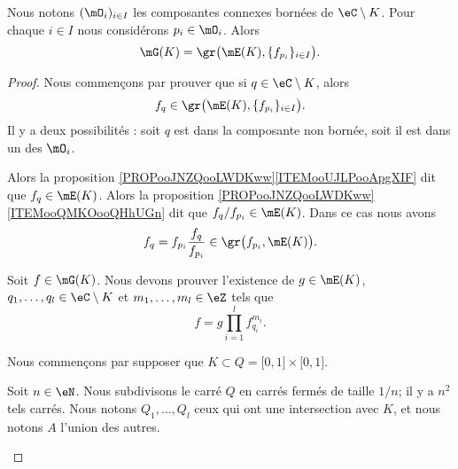 \begin{lemma}     \label{LEMooEJRMooNJhMov}
	Nous notons \( (\mO_i)_{i\in I}\) les composantes connexes bornées de \( \eC\setminus K\). Pour chaque \( i\in I\) nous considérons \( p_i\in\mO_i\). Alors
	\begin{equation}
		\mG(K)=\gr\big( \mE(K),\{ f_{p_i} \}_{i\in I} \big).
	\end{equation}
\end{lemma}

\begin{proof}
	Nous commençons par prouver que si \( q\in\eC\setminus K\), alors
	\begin{equation}
		f_q\in\gr\big( \mE(K),\{ f_{p_i} \}_{i\in I} \big).
	\end{equation}
	Il y a deux possibilités : soit \( q\) est dans la composante non bornée, soit il est dans un des \( \mO_i\).
	\begin{subproof}
		Alors la proposition \ref{PROPooJNZQooLWDKww}\ref{ITEMooUJLPooApgXIF} dit que \( f_q\in\mE(K)\).
		\spitem[Si \( q\in\mO_i\)]
		Alors la proposition \ref{PROPooJNZQooLWDKww}\ref{ITEMooQMKOooQHhUGn} dit que \( f_q/f_{p_i}\in\mE(K)\). Dans ce cas nous avons
		\begin{equation}
			f_q=f_{p_i}\frac{ f_q }{ f_{p_i} }\in\gr\big( f_{p_i},\mE(K) \big).
		\end{equation}
	\end{subproof}
	Soit \( f\in\mG(K)\). Nous devons prouver l'existence de \( g\in\mE(K)\), \( q_1,\ldots, q_l\in\eC\setminus K\) et \( m_1,\ldots, m_l\in \eZ\) tels que
	\begin{equation}
		f=g\prod_{i=1}^lf_{q_i}^{m_i}.
	\end{equation}

	Nous commençons par supposer que \( K\subset Q=\mathopen[ 0 , 1 \mathclose]\times\mathopen[ 0 , 1 \mathclose]\).
	\begin{subproof}
		\spitem[Les petits carrés]
		Soit \( n\in \eN\). Nous subdivisons le carré \( Q\) en carrés fermés de taille \( 1/n\); il y a \( n^2\) tels carrés. Nous notons \( Q_1,\ldots, Q_l\) ceux qui ont une intersection avec \( K\), et nous notons \( A\) l'union des autres.


\end{subproof}
\end{proof}
